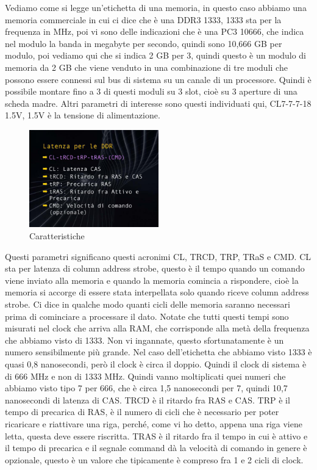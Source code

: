 Vediamo come si legge un'etichetta di una memoria, in questo caso abbiamo una memoria commerciale in cui ci dice che è una DDR3 1333, 1333 sta per la frequenza in MHz, poi vi sono delle indicazioni che è una PC3 10666, che indica nel modulo la banda in megabyte per secondo, quindi sono 10,666 GB per modulo, poi vediamo qui che si indica 2 GB per 3, quindi questo è un modulo di memoria da 2 GB che viene venduto in una combinazione di tre moduli che possono essere connessi sul bus di sistema su un canale di un processore.
Quindi è possibile montare fino a 3 di questi moduli su 3 slot, cioè su 3 aperture di una scheda madre.
Altri parametri di interesse sono questi individuati qui, CL7-7-7-18 1.5V, 1.5V è la tensione di alimentazione.

\FloatBarrier
\begin{figure}[H]
  \centering
  \includegraphics[width=0.50\textwidth,
                    trim=40 40 40 40, %
                    clip]
                    {images/Lez05_p02_fig_02.png}
  \caption{Caratteristiche}
  \label{fig:Lez05_p02_fig_02}
\end{figure}
\FloatBarrier
\noindent

Questi parametri significano questi acronimi CL, TRCD, TRP, TRaS e CMD.
CL sta per latenza di column address strobe, questo è il tempo quando un comando viene inviato alla memoria e quando la memoria comincia a rispondere, cioè la memoria si accorge di essere stata interpellata solo quando riceve column address strobe. Ci dice in qualche modo quanti cicli delle memoria saranno necessari prima di cominciare a processare il dato.
Notate che tutti questi tempi sono misurati nel clock che arriva alla RAM, che corrisponde alla metà della frequenza che abbiamo visto di 1333.
Non vi ingannate, questo sfortunatamente è un numero sensibilmente più grande.
Nel caso dell'etichetta che abbiamo visto 1333 è quasi 0,8 nanosecondi, però il clock è circa il doppio. Quindi il clock di sistema è di 666 MHz e non di 1333 MHz.
Quindi vanno moltiplicati quei numeri che abbiamo visto tipo 7 per 666, che è circa 1,5 nanosecondi per 7, quindi 10,7 nanosecondi di latenza di CAS.
TRCD è il ritardo fra RAS e CAS.
TRP è il tempo di precarica di RAS, è il numero di cicli che è necessario per poter ricaricare e riattivare una riga, perché, come vi ho detto, appena una riga viene letta, questa deve essere riscritta.
TRAS è il ritardo fra il tempo in cui è attivo e il tempo di precarica e il segnale command dà la velocità di comando in genere è opzionale, questo è un valore che tipicamente è compreso fra 1 e 2 cicli di clock.


